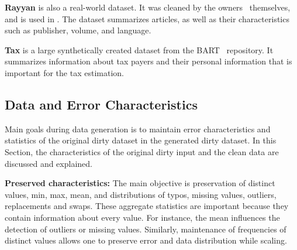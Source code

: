 \textbf{Rayyan} is also a real-world dataset. 
It was cleaned by the owners~\cite{QuzzaniHFE2016} themselves, and is used in \textcite{MahdaviAFMQST2019, MahdaviA2020}.
The dataset summarizes articles, as well as their characteristics such as publisher, volume, and language.

\textbf{Tax} is a large synthetically created dataset from the BART~\cite{bart} repository.
It summarizes information about tax payers and their personal information that is important for the tax estimation.

\subsection{Data and Error Characteristics}
\label{sec:data_characteristics}
Main goals during data generation is to maintain error characteristics and  statistics of the original dirty dataset in the generated dirty dataset.
In this Section, the characteristics of the original dirty input and the clean data are discussed and explained. 

\textbf{Preserved characteristics:} 
The main objective is preservation of distinct values, min, max, mean, and distributions of typos, missing values, outliers, replacements and swaps.
These aggregate statistics are important because they contain information about every value.
For instance, the mean influences the detection of outliers or missing values.
Similarly, maintenance of frequencies of distinct values allows one to preserve error and data distribution while scaling.

